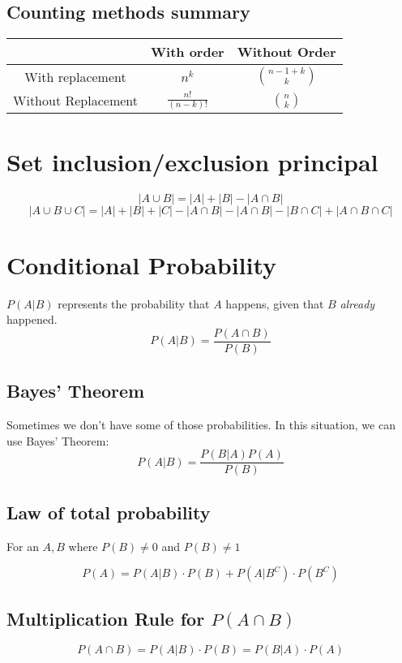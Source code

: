 \documentclass{article}
\begin{document}
{			\subsection*{Counting methods summary}
				\begin{center}
					\begin{tabular}{ |c| c c| }
					\hline
					& With order & Without Order \\
					\hline
					With replacement & \( n^k \) & \( \binom{n-1+k}{k}\) \\
					\hline
					Without Replacement & \(\frac{n!}{(n-k)!}\) & \(\binom{n}{k} \) \\
					\hline
					\end{tabular}
				\end{center}

		\section*{\Large{\textbf{Set inclusion/exclusion principal}}}

			\[ |A \cup B| = |A| + |B| - |A \cap B| \]
			\[ |A \cup B \cup C| = |A| + |B| + |C| - |A \cap B| - |A \cap B| - |B \cap C| + |A \cap B \cap C| \]
		\section*{\Large{\textbf{Conditional Probability}}}
			\(P(A | B)\) represents the probability that \(A\) happens, given that \(B\) \emph{already} happened.
			\[
				P(A | B) = \frac{P(A \cap B)}{P(B)}
			\]

			\subsection*{Bayes' Theorem}
				
				Sometimes we don't have some of those probabilities. In this situation, we can use Bayes' Theorem:
				\[
					P(A|B) = \frac{P(B | A) P(A)}{P(B)} 
				\]

			\subsection*{Law of total probability}
				For an \(A, B\) where \( P(B) \neq 0 \) and \( P(B) \neq 1\)

				\[
					P(A) = P(A|B) \cdot P(B) + P(A | B^C) \cdot P(B^C)
				\]

			\subsection*{Multiplication Rule for \(P(A \cap B)\)} 
				\[
					P(A \cap B) = P(A|B) \cdot P(B) = P(B|A) \cdot P(A)
				\]

}
\end{document}
